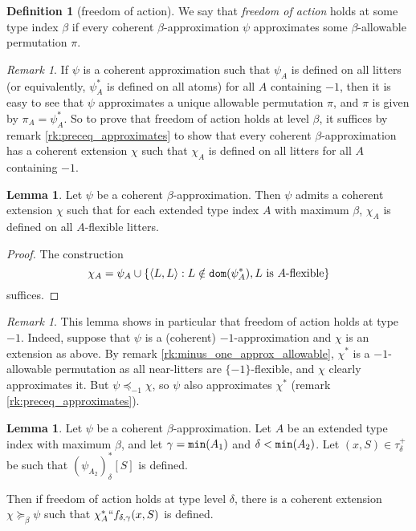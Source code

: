 \documentclass{article}
\theoremstyle{definition}
\newtheorem{lemma}[theorem]{Lemma}
\newtheorem{definition}[theorem]{Definition}
\theoremstyle{remark}
\newtheorem{remark}[theorem]{Remark}
\begin{document}
\begin{definition}[freedom of action]\label{def:foa}
  We say that {\em freedom of action\/} holds at some type index $\beta$ if every coherent $\beta$-approximation $\psi$ approximates some $\beta$-allowable permutation $\pi$.
\end{definition}
\begin{remark}\label{rk:foa_suffices}
  If $\psi$ is a coherent approximation such that $\psi_A$ is defined on all litters (or equivalently, $\psi_A^*$ is defined on all atoms) for all $A$ containing $-1$, then it is easy to see that $\psi$ approximates a unique allowable permutation $\pi$, and $\pi$ is given by $\pi_A= \psi_A^*$.
  So to prove that freedom of action holds at level $\beta$, it suffices by remark \ref{rk:preceq_approximates} to show that every coherent $\beta$-approximation has a coherent extension $\chi$ such that $\chi_A$ is defined on all litters for all $A$ containing $-1$.
\end{remark}
\begin{lemma}\label{lem:foa_flexible}
  Let $\psi$ be a coherent $\beta$-approximation.
  Then $\psi$ admits a coherent extension $\chi$ such that for each extended type index $A$ with maximum $\beta$, $\chi_A$ is defined on all $A$-flexible litters.
\end{lemma}
\begin{proof}
  The construction
  $$ \chi_A = \psi_A \cup \{ \langle L, L \rangle : L \notin {\tt dom}(\psi_A^*), L\ \mathrm{is}\ A\mathrm{\mbox{-flexible}} \} $$
  suffices.
\end{proof}
\begin{remark}
  This lemma shows in particular that freedom of action holds at type $-1$.
  Indeed, suppose that $\psi$ is a (coherent) $-1$-approximation and $\chi$ is an extension as above.
  By remark \ref{rk:minus_one_approx_allowable}, $\chi^*$ is a $-1$-allowable permutation as all near-litters are $\{-1\}$-flexible, and $\chi$ clearly approximates it.
  But $\psi \preceq_{-1} \chi$, so $\psi$ also approximates $\chi^*$ (remark \ref{rk:preceq_approximates}).
\end{remark}
\begin{lemma}\label{lem:foa_inflexible}
  Let $\psi$ be a coherent $\beta$-approximation.
  Let $A$ be an extended type index with maximum $\beta$, and let $\gamma = {\tt min}(A_1)$ and $\delta < {\tt min}(A_2)$.
  Let $(x, S) \in \tau_\delta^+$ be such that $(\psi_{A_2})_\delta^*[S]$ is defined.

  Then if freedom of action holds at type level $\delta$, there is a coherent extension $\chi \succeq_\beta \psi$ such that $
  \chi_A^* `` f_{\delta,\gamma}(x, S)$ is defined.
\end{lemma}
\end{document}
